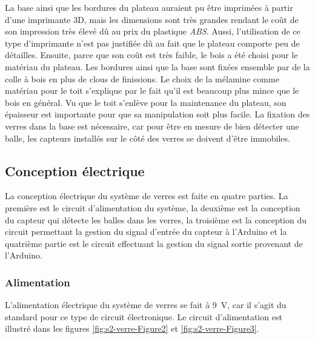 La base ainsi que les bordures du plateau auraient pu être imprimées à partir d’une imprimante 3D, mais les dimensions sont très grandes rendant le coût de son impression très élevé dû au prix du plastique \emph{ABS}.
Aussi, l’utilisation de ce type d’imprimante n’est pas justifiée dû au fait que le plateau comporte peu de détailles.
Ensuite, parce que son coût est très faible, le bois a été choisi pour le matériau du plateau.
Les bordures ainsi que la base sont fixées ensemble par de la colle à bois en plus de clous de finissions.
Le choix de la mélamine comme matériau pour le toit s’explique par le fait qu’il est beaucoup plus mince que le bois en général.
Vu que le toit s’enlève pour la maintenance du plateau, son épaisseur est importante pour que sa manipulation soit plus facile.
La fixation des verres dans la base est nécessaire, car pour être en mesure de bien détecter une balle, les capteurs installés sur le côté des verres se doivent d’être immobiles.

\subsection{Conception électrique}

La conception électrique du système de verres est faite en quatre parties.
La première est le circuit d’alimentation du système, la deuxième est la conception du capteur qui détecte les balles dans les verres, la troisième est la conception du circuit permettant la gestion du signal d’entrée du capteur à l'Arduino et la quatrième partie est le circuit effectuant la gestion du signal sortie provenant de l’Arduino.

\subsubsection{Alimentation}

L’alimentation électrique du système de verres se fait à 9~V, car il s’agit du standard pour ce type de circuit électronique.
Le circuit d’alimentation est illustré dans les figures \ref{fig:s2-verre-Figure2} et \ref{fig:s2-verre-Figure3}.

